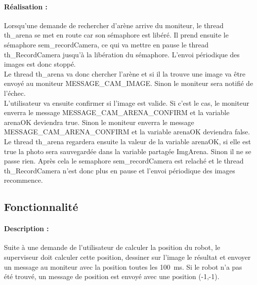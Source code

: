\documentclass[11pt, a4paper]{paper}
\newcounter{cptreq}
\begin{document}
{{\paragraph{\color{black}Réalisation :}  {\color{black} Lorsqu'une demande de rechercher d'arène arrive du moniteur, le thread th\_arena se met en route car son sémaphore est libéré. Il prend ensuite le sémaphore sem\_recordCamera, ce qui va mettre en pause le thread th\_RecordCamera jusqu'à la libération du sémaphore. L'envoi périodique des images est donc stoppé.\\
Le thread th\_arena va donc chercher l'arène et si il la trouve une image va être envoyé au moniteur MESSAGE\_CAM\_IMAGE. Sinon le moniteur sera notifié de l'échec.\\
L'utilisateur va ensuite confirmer si l'image est valide. Si c'est le cas, le moniteur enverra le message MESSAGE\_CAM\_ARENA\_CONFIRM et la variable arenaOK deviendra true. Sinon le moniteur enverra le message MESSAGE\_CAM\_ARENA\_CONFIRM et la variable arenaOK deviendra false. \\
Le thread th\_arena regardera ensuite la valeur de la variable arenaOK, si elle est true la photo sera sauvegardée dans la variable partagée ImgArena. Sinon il ne se passe rien. Après cela le semaphore sem\_recordCamera est relaché et le thread th\_RecordCamera n'est donc plus en pause et l'envoi périodique des images recommence.}

\subsection{Fonctionnalité \thecptreq}

\paragraph{Description :} Suite à une demande de l'utilisateur de calculer la position du robot, le superviseur doit calculer cette position, dessiner sur l'image le résultat et envoyer un message au moniteur avec la position toutes les 100~ms. Si le robot n'a pas été trouvé, un message de position est envoyé avec une position (-1,-1).

}}
\end{document}
